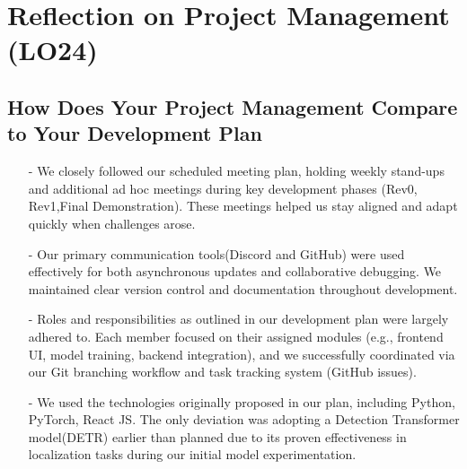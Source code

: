\documentclass{article}
\begin{document}
\section{Reflection on Project Management (LO24)}

\subsection{How Does Your Project Management Compare to Your Development Plan}
\begin{enumerate}
    \item[-] We closely followed our scheduled meeting plan, holding weekly stand-ups and additional ad hoc meetings during key development phases (Rev0, Rev1,Final Demonstration). These meetings helped us stay aligned and adapt quickly when challenges arose. 
    \item[-] Our primary communication tools(Discord and GitHub) were used effectively for both asynchronous updates and collaborative debugging. We maintained clear version control and documentation throughout development. 
    \item[-] Roles and responsibilities as outlined in our development plan were largely adhered to. Each member focused on their assigned modules (e.g., frontend UI, model training, backend integration), and we successfully coordinated via our Git branching workflow and task tracking system (GitHub issues).
    \item[-] We used the technologies originally proposed in our plan, including Python, PyTorch, React JS. The only deviation was adopting a Detection Transformer model(DETR) earlier than planned due to its proven effectiveness in localization tasks during our initial model experimentation. 
\end{enumerate}
\end{document}
